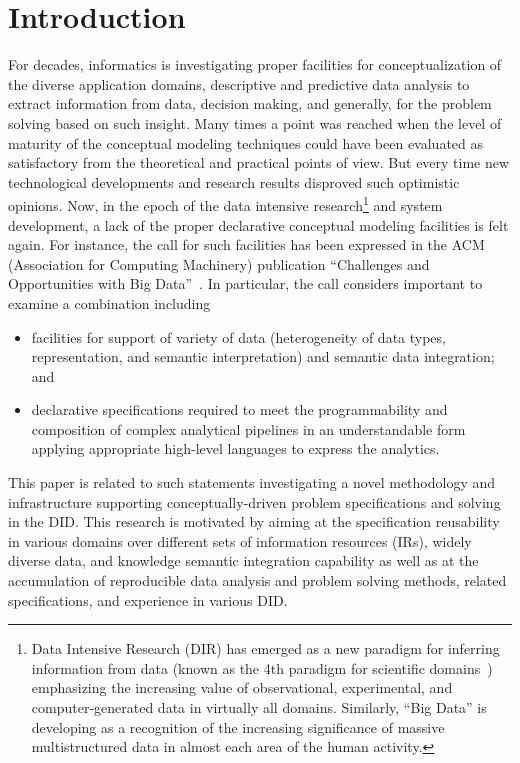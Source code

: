       \begin{multicols}{2}

            \label{st\stat}

\section{Introduction}

  \noindent
For decades, informatics is investigating proper facilities for conceptualization of the diverse
application domains, descriptive and predictive data analysis to extract information from
data, decision making, and generally, for the problem solving based on such insight. Many
times a point was reached when the level of maturity of the conceptual modeling techniques
could have been evaluated as satisfactory from the theoretical and practical points of view.
But every time new technological developments and research results disproved such
optimistic opinions. Now, in the epoch of the data intensive research\footnote[2]{Data Intensive
Research (DIR) has emerged as a new paradigm for inferring information from data (known
as the 4th paradigm for scientific domains~\cite{2-kal}) emphasizing the increasing value of
observational, experimental, and computer-generated data in virtually all domains. Similarly,
``Big Data'' is developing as a recognition of the increasing significance of massive
multistructured data in almost each area of the human activity.} and system development, a lack
of the proper declarative conceptual modeling facilities is felt again. For instance, the call
for such facilities has been expressed in the ACM (Association for Computing Machinery)
publication ``Challenges and
Opportunities with Big Data''~\cite{1-kal}. In particular, the call considers important to examine a
combination including
  \begin{itemize}
\item facilities for support of variety of data (heterogeneity of data types,
representation, and semantic interpretation) and semantic data integration; and\\[-16pt]
\item declarative specifications required to meet the programmability and composition
of complex analytical pipelines in an understandable form applying appropriate
high-level languages to express the analytics.
\end{itemize}

  This paper is related to such statements investigating a novel methodology and
infrastructure supporting conceptually-driven problem specifications and solving in
the DID. This research is motivated by aiming at the
specification reusability in various domains over different sets of information
resources (IRs), widely diverse data, and knowledge semantic integration capability as well
as at the accumulation of reproducible data analysis and problem solving methods,
related specifications, and experience in various DID.


\end{multicols}
